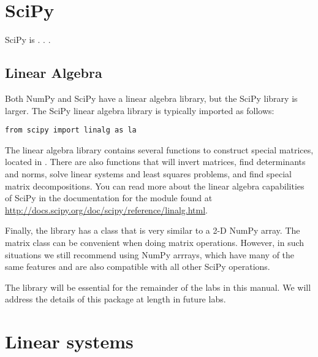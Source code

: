 
\section*{SciPy} %

SciPy is . . .

\subsection*{Linear Algebra} %

Both NumPy and SciPy have a linear algebra library, but the SciPy library is larger.
The SciPy linear algebra library is typically imported as follows:

\begin{lstlisting}
from scipy import linalg as la
\end{lstlisting}

The linear algebra library contains several functions to construct special
matrices, located in .
There are also functions that will invert matrices, find determinants and norms, solve linear systems and least squares problems, and find special matrix decompositions.
You can read more about the linear algebra capabilities of SciPy in the documentation for the  module found at \url{http://docs.scipy.org/doc/scipy/reference/linalg.html}.

Finally, the  library has a  class that is very
similar to a 2-D NumPy array.
The matrix class can be convenient when doing matrix operations.
However, in such situations we still recommend using NumPy arrrays, which have many of the same features and are also compatible with all other SciPy operations.

The  library will be essential for the remainder of the labs in this manual.
We will address the details of this package at length in future labs.

\section*{Linear systems} %

